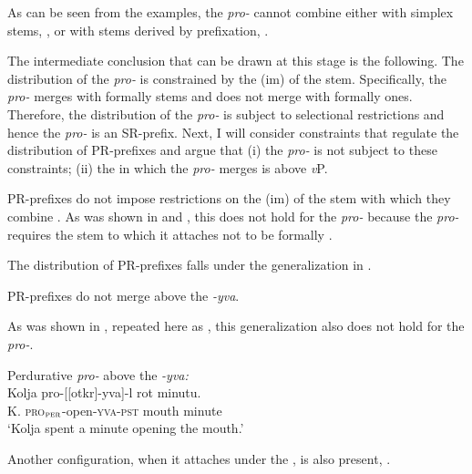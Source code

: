 \documentclass[output=paper,colorlinks,citecolor=brown,newtxmath]{langsci/langscibook}
\begin{document}
\noindent As can be seen from the examples, the  \textit{pro-} cannot combine either with simplex  stems, , or with  stems derived by prefixation, .


The intermediate conclusion that can be drawn at this stage is the following. The distribution of the  \textit{pro-} is constrained by the (im) of the stem. Specifically, the  \textit{pro-} merges with formally  stems and does not merge with formally  ones. Therefore, the distribution of the  \textit{pro-} is subject to selectional restrictions and hence the  \textit{pro-} is an SR-prefix. Next, I will consider constraints that regulate the distribution of PR-prefixes and argue that (i) the  \textit{pro-} is not subject to these constraints; (ii) the  in which the  \textit{pro-} merges is above \textit{v}P.

PR-prefixes do not impose restrictions on the (im) of the stem with which they combine \citep{tatevosov2009mnozestvennaja,tatevosov2013mnozestvennaja}. As was shown in  and , this does not hold for the  \textit{pro-} because the  \textit{pro-} requires the stem to which it attaches not to be formally .

The distribution of PR-prefixes falls under the generalization in .

\ea \label{ex:naumov:15}
PR-prefixes do not merge above the  \textit{-yva}.
\z

\noindent As was shown in , repeated here as , this generalization also does not hold for the  \textit{pro-}.


 \ea Perdurative \textit{pro-} above the  \textit{-yva:}\label{ex:naumov:16}\smallskip\\
     \gll Kolja	pro-[[otkr]-yva]-l		rot		minutu.\\
K.	\textsc{pro}$_\textsc{per}$-open-\textsc{yva}-\textsc{pst}	mouth		minute\\
     \glt `Kolja spent a minute opening the mouth.'
     \z


\noindent Another configuration, when it attaches under the , is also present, .
\end{document}
